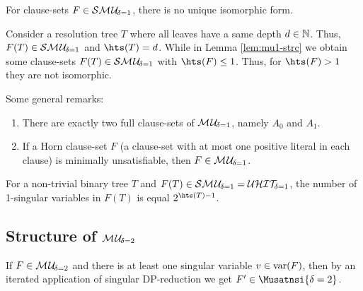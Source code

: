 \documentclass{report}
\begin{document}
\begin{lem}\label{lem:mu1-noniso}
For clause-sets $F \in \mathcal{S}\mathcal{M\hspace{0.8pt}U}_{\!\delta=1}$, there is no unique isomorphic form.
\end{lem}
\begin{prf}
Consider a resolution tree $T$ where all leaves have a same depth $d \in \mathbb{N}$. Thus, $F(T) \in \mathcal{S}\mathcal{M\hspace{0.8pt}U}_{\!\delta=1}$ and $\hts(T) =d$. While in Lemma \ref{lem:mu1-strc} we obtain some clause-sets $F(T) \in \mathcal{S}\mathcal{M\hspace{0.8pt}U}_{\!\delta=1}$ with $\hts(F) \le 1$. Thus, for $\hts(F) > 1$ they are not isomorphic.
      
\end{prf}
Some general remarks: 
  \begin{enumerate}
  \item There are exactly two full clause-sets of $\mathcal{M\hspace{0.8pt}U}_{\!\delta=1}$, namely $A_0$ and $A_1$.
  \item If a Horn clause-set $F$ (a clause-set with at most one positive literal in each clause) is minimally unsatisfiable, then $F \in \mathcal{M\hspace{0.8pt}U}_{\!\delta=1}$.
  \end{enumerate} 
  
\begin{lem}\label{lem:hitnum}
For a non-trivial binary tree $T$ and $F(T) \in \mathcal{S}\mathcal{M\hspace{0.8pt}U}_{\!\delta=1}=\mathcal{U}\mathcal{HIT}_{\!\!\delta=1}$, the number of 1-singular variables in $F(T)$ is equal $2^{\hts(T)-1}$.
\end{lem}
\begin{prf}
\end{prf}
\subsection{Structure of $\mathcal{M\hspace{0.8pt}U}_{\!\delta=2}$}
\label{sec:smu2}

\begin{lem}\label{lem:mu2-mup}
If $F \in \mathcal{M\hspace{0.8pt}U}_{\!\delta=2}$ and there is at least one singular variable $v \in \operatorname{var}(F)$, then by an iterated application of singular DP-reduction we get $F' \in \Musatnsi{\delta=2}$.
\end{lem}
\end{document}
